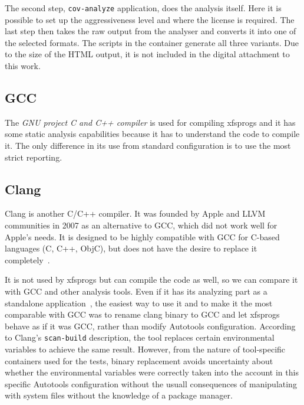 The second step, {\tt cov-analyze} application, does the analysis itself. Here
it is possible to set up the aggressiveness level and where the license is
required. The last step then takes the raw output from the analyser and
converts it into one of the selected formats. The scripts in the container
generate all three variants. Due to the size of the HTML output, it is not
included in the digital attachment to this work.

\subsection{GCC}
The {\em GNU project C and C++ compiler} is used for compiling xfsprogs and it
has some static analysis capabilities because it has to understand the code to
compile it. The only difference in its use from standard configuration is to
use the most strict reporting.

\subsection{Clang}
Clang is another C/C++ compiler. It was founded by Apple and LLVM communities
in 2007 as an alternative to GCC, which did not work well for Apple's needs. It
is designed to be highly compatible with GCC for C-based languages (C, C++,
ObjC), but does not have the desire to replace it
completely~\cite{ClangAnnouncement}.

It is not used by xfsprogs but can compile the code as well, so we can compare
it with GCC and other analysis tools. Even if it has its analyzing part as a
standalone application~\cite{ClangAnalyser}, the easiest way to use it and to
make it the most comparable with GCC was to rename clang binary to GCC and let
xfsprogs behave as if it was GCC, rather than modify Autotools configuration.
According to Clang's {\tt scan-build} description, the tool replaces certain
environmental variables to achieve the same result. However, from the nature of
tool-specific containers used for the tests, binary replacement avoids
uncertainty about whether the environmental variables were correctly taken into
the account in this specific Autotools configuration without the usuall
consequences of manipulating with system files without the knowledge of a
package manager.

